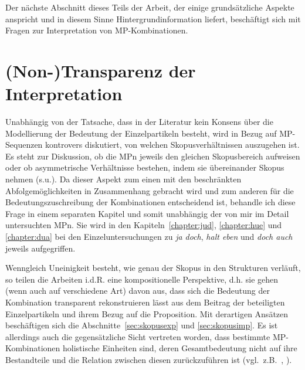 Der nächste Abschnitt dieses Teils der Arbeit, der einige grundsätzliche Aspekte anspricht und in diesem Sinne Hintergrundinformation liefert, beschäftigt sich mit Fragen zur Interpretation von MP-Kom\-bi\-na\-ti\-on\-en.

\section{(Non-)Transparenz der Interpretation}
\label{sec:transparenz}
Unabhängig von der Tatsache, dass in der Literatur kein Konsens über die Modellierung der Bedeutung der Einzelpartikeln besteht, wird in Bezug auf MP-Sequen\-zen kontrovers diskutiert, von welchen Skopusverhältnissen  auszugehen ist. Es steht zur Diskussion, ob die MPn jeweils den gleichen Skopusbereich aufweisen oder ob asymmetrische Verhältnisse bestehen, indem sie übereinander Skopus nehmen (s.u.). Da dieser Aspekt zum einen mit den beschränkten Abfolgemög\-lichkeiten in Zusammenhang gebracht wird und zum anderen für die Bedeutungszuschreibung der Kombinationen entscheidend ist, behandle ich diese Frage in einem se\-paraten Kapitel und somit unabhängig der von mir im Detail untersuchten MPn. Sie wird in den Kapiteln~\ref{chapter:jud}, \ref{chapter:hue} und \ref{chapter:dua} bei den Einzeluntersuchungen zu \textit{ja doch}, \textit{halt eben} und \textit{doch auch} jeweils aufgegriffen. 

Wenngleich Uneinigkeit besteht, wie genau der Skopus in den Strukturen verläuft, so teilen die Arbeiten i.d.R. eine kompositionelle Perspektive, d.h. sie gehen (wenn auch auf verschiedene Art) davon aus, dass sich die Bedeutung der Kombination transparent rekonstruieren lässt aus dem Beitrag der beteiligten Einzelpartikeln und ihrem Bezug auf die Proposition. Mit derartigen Ansätzen beschäftigen sich die Abschnitte~\ref{sec:skopusexp} und \ref{sec:skopusimp}. Es ist allerdings auch die gegensätzliche Sicht vertreten worden, dass bestimmte MP-Kom\-bi\-na\-ti\-on\-en holistische Einheiten sind, deren Gesamtbedeutung nicht auf ihre Bestandteile und die Relation zwischen diesen zurückzuführen ist (vgl.\ z.B.\ \citealt[487]{Eroms2000}, \citealt{Lemnitzer2001}).

